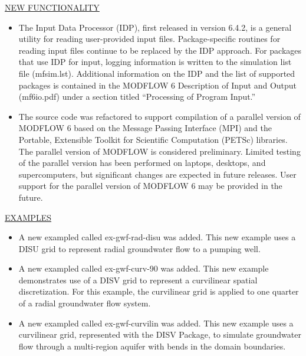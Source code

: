 	
	\item \currentmodflowversion

	\underline{NEW FUNCTIONALITY}
	\begin{itemize}
		\item The Input Data Processor (IDP), first released in version 6.4.2, is a general utility for reading user-provided input files.  Package-specific routines for reading input files continue to be replaced by the IDP approach.  For packages that use IDP for input, logging information is written to the simulation list file (mfsim.lst).  Additional information on the IDP and the list of supported packages is contained in the MODFLOW 6 Description of Input and Output (mf6io.pdf) under a section titled ``Processing of Program Input.''
		\item The source code was refactored to support compilation of a parallel version of MODFLOW 6 based on the Message Passing Interface (MPI) and the Portable, Extensible Toolkit for Scientific Computation (PETSc) libraries.  The parallel version of MODFLOW is considered preliminary. Limited testing of the parallel version has been performed on laptops, desktops, and supercomputers, but significant changes are expected in future releases. User support for the parallel version of MODFLOW 6 may be provided in the future.
	\end{itemize}

	\underline{EXAMPLES}
	\begin{itemize}
		\item A new exampled called ex-gwf-rad-disu was added.  This new example uses a DISU grid to represent radial groundwater flow to a pumping well.
		\item A new exampled called ex-gwf-curv-90 was added.  This new example demonstrates use of a DISV grid to represent a curvilinear spatial discretization.  For this example, the curvilinear grid is applied to one quarter of a radial groundwater flow system.
		\item A new exampled called ex-gwf-curvilin was added.  This new example uses a curvilinear grid, represented with the DISV Package, to simulate groundwater flow through a multi-region aquifer with bends in the domain boundaries.
	\end{itemize}

